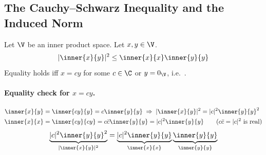 \subsection{The Cauchy--Schwarz Inequality and the Induced Norm}\label{ss:cauchy-schwarz}
\begin{theorem}
Let $\V$ be an inner product space. Let $x,y\in\V$.
\[
|\inner{x}{y}|^2 \le \inner{x}{x}\inner{y}{y}
\]
Equality holds iff $x = cy$ for some $c\in\C$ or $y = 0_\V$, i.e.\ .
\end{theorem}
\paragraph{Equality check for $x = cy$.}
\begin{align*}
\inner{x}{y} &= \inner{cy}{y} = c\inner{y}{y} \;\Rightarrow\; |\inner{x}{y}|^2 = |c|^2\inner{y}{y}^2\\
\inner{x}{x} &= \inner{cy}{cy} = c\bar c\inner{y}{y} = |c|^2\inner{y}{y} \qquad (c\bar c = |c|^2 \text{ is real})
\end{align*}
\[
\underbrace{|c|^2\inner{y}{y}^2}_{|\inner{x}{y}|^2} = \underbrace{|c|^2\inner{y}{y}}_{\inner{x}{x}}\underbrace{\inner{y}{y}}_{\inner{y}{y}}
\]

